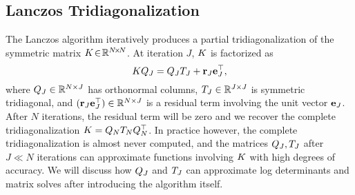 

\subsection{Lanczos Tridiagonalization}
\label{sec:lanczos}

The Lanczos algorithm \cite{lanczos1950iteration} iteratively produces a partial tridiagonalization of the symmetric matrix $K \! \in \! \mathbb{R}^{N \! \times \! N}$.
At iteration $J$, $K$ is factorized as
%
\begin{equation}
  K Q_J = Q_J T_J + \mathbf{r}_J \mathbf{e}_{J}^\top,
  \label{eqn:lanczos}
\end{equation}
%
where $Q_J \in \mathbb{R}^{N \times J}$ has orthonormal columns, $T_J \in \mathbb{R}^{J \times J}$ is symmetric tridiagonal, and $(\mathbf{r}_J \mathbf{e}_{J}^\top) \in \mathbb{R}^{N \times J}$ is a residual term involving the unit vector $\mathbf{e}_{J}$.
After $N$ iterations, the residual term will be zero and we recover the complete tridiagonalization $K = Q_N T_N Q^\top_N$.
In practice however, the complete tridiagonalization is almost never computed, and the matrices $Q_J, T_J$ after $J \ll N$ iterations can approximate functions involving $K$ with high degrees of accuracy.
We will discuss how $Q_J$ and $T_J$ can approximate log determinants and matrix solves after introducing the algorithm itself.


